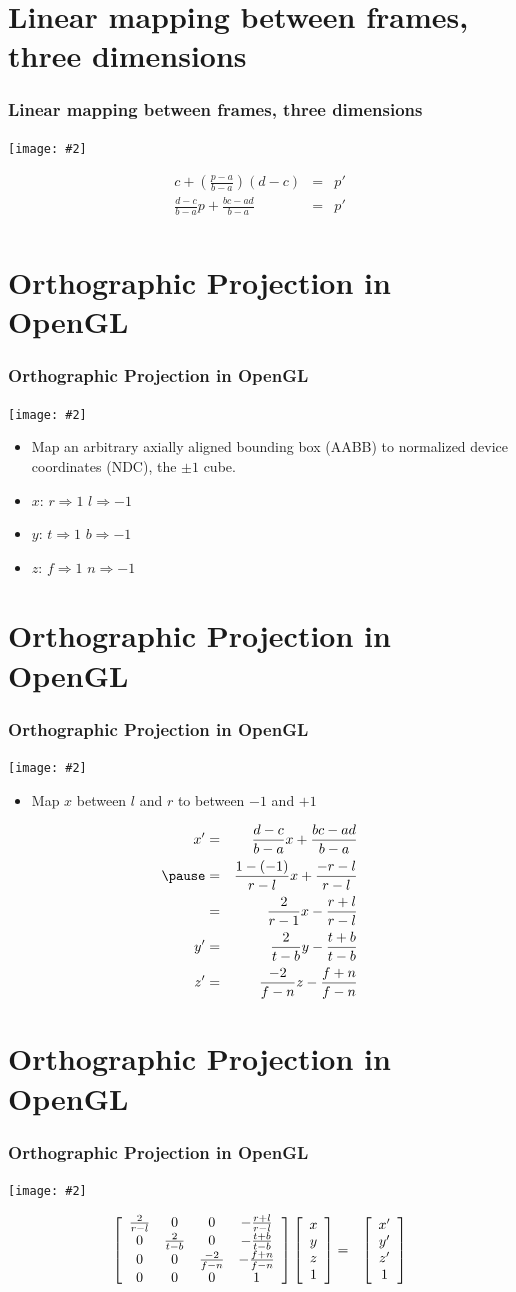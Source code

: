 \documentclass[slidestop,xcolor=pst]{beamer}
\newcommand{\graphc}[2]{\centerline{\texttt{[image: \#2]}}}
\newcommand{\sect}[1]{
\section{#1}
\begin{frame}[fragile]\frametitle{#1}
}
\begin{document}
\sect{Linear mapping between frames, three dimensions}
\graphc{0.5}{threedlinear.png}
\pause
\begin{eqnarray*}
 c + \left(\frac{p-a}{b-a}\right)(d-c) &=& p'\\
\frac{d-c}{b-a}p + \frac{bc - ad}{b-a} &=& p'\\
\end{eqnarray*}
\end{frame}


\sect{Orthographic Projection in OpenGL}
\graphc{.9}{gl_projectionmatrix02.png}
\begin{itemize}
\item Map an arbitrary axially aligned bounding box (AABB) to
  normalized device coordinates (NDC), the $\pm 1$ cube.
\item $x$: $r \Rightarrow 1$\hspace{1cm}
 $l \Rightarrow -1$\\
\item $y$: $t \Rightarrow 1$\hspace{1cm}
 $b \Rightarrow -1$\\
\item $z$:  $f \Rightarrow 1$\hspace{1cm}
 $n \Rightarrow -1$
\end{itemize}
\end{frame}

\sect{Orthographic Projection in OpenGL}
\graphc{1}{onedlinear.png}
\begin{itemize}
\item Map $x$ between $l$ and $r$ to between $-1$ and $+1$
\end{itemize}
\begin{eqnarray*}
x' &=& \frac{d-c}{b-a}x + \frac{bc - ad}{b-a} \\\pause
   &=& \frac{1-(-1)}{r-l}x + \frac{-r-l}{r-l}\\
    &=& \frac{2}{r-1}x - \frac{r+l}{r-l}\\
y' &=& \frac{2}{t-b}y - \frac{t+b}{t-b}\\
z' &=& \frac{-2}{f-n}z - \frac{f+n}{f-n}
\end{eqnarray*}
\end{frame}

\sect{Orthographic Projection in OpenGL}
\graphc{.9}{gl_projectionmatrix02.png}
\begin{eqnarray*}
\left[\begin{array}{cccc} \frac{2}{r-l} & 0 & 0 & -\frac{r+l}{r-l} \\ 0 & \frac{2}{t-b} & 0 & -\frac{t+b}{t-b} \\ 0 & 0 & \frac{-2}{f-n} & -\frac{f+n}{f-n} \\0&0&0&1\end{array}\right]
\left[\begin{array}{c} x\\y\\z \\ 1\end{array}\right] 
&=&
\left[\begin{array}{c} x'\\y'\\z' \\ 1\end{array}\right]
\end{eqnarray*}
\end{frame}
\end{document}
